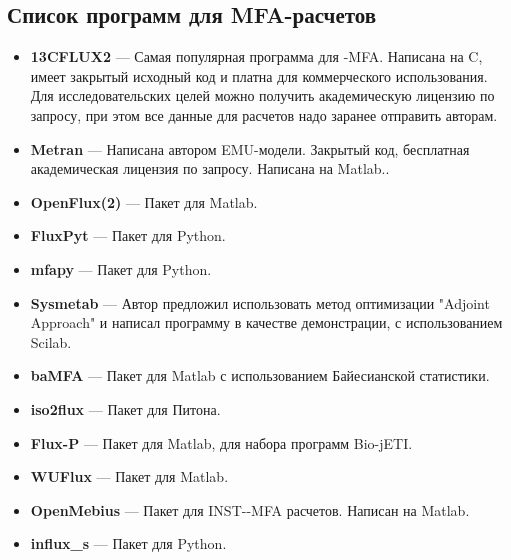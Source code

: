 \documentclass[14pt, a4paper]{extreport}
\newcommand{\CC}{C\nolinebreak\hspace{-.05em}\raisebox{.4ex}{\tiny\bf +}\nolinebreak\hspace{-.10em}\raisebox{.4ex}{\tiny\bf +}}
\def\CC{{C\nolinebreak[4]\hspace{-.05em}\raisebox{.4ex}{\tiny\bf ++}}} %
\begin{document}
\begin{appendices}
	\chapter{Список программ для MFA-расчетов}
	\begin{itemize}
		\item \textbf{13CFLUX2} --- Самая популярная программа для -MFA. Написана на \CC{}, имеет закрытый исходный код и платна для коммерческого использования. Для исследовательских целей можно получить академическую лицензию по запросу\cite{13CFLUX2}, при этом все данные для расчетов надо заранее отправить авторам.
		
		\item \textbf{Metran} --- Написана автором EMU-модели. Закрытый код, бесплатная академическая лицензия по запросу. Написана на Matlab.\cite{Metran}.
		
		\item \textbf{OpenFlux(2)} --- Пакет для Matlab\cite{OpenFlux, OpenFlux2}.
		
		\item \textbf{FluxPyt} --- Пакет для Python\cite{FluxPyt}.
		
		\item \textbf{mfapy} --- Пакет для Python.
		
		\item \textbf{Sysmetab} --- Автор предложил использовать метод оптимизации "Adjoint Approach"\cite{adjoint_approach} и написал программу в качестве демонстрации, с использованием Scilab.
		
		\item \textbf{baMFA} --- Пакет для Matlab с использованием Байесианской статистики\cite{bayesian_3}.
		
		\item \textbf{iso2flux} --- Пакет для Питона\cite{p13CMFA}.
		
		\item \textbf{Flux-P} --- Пакет для Matlab, для набора программ Bio-jETI\cite{Flux-P}.
		
		\item \textbf{WUFlux} --- Пакет для Matlab\cite{WUFlux}.
		
		\item \textbf{OpenMebius} --- Пакет для INST--MFA расчетов. Написан на Matlab\cite{OpenMebius}.
		
		\item \textbf{influx\_s} --- Пакет для Python\cite{influxs}.
	\end{itemize}
	
\end{appendices}
\end{document}
